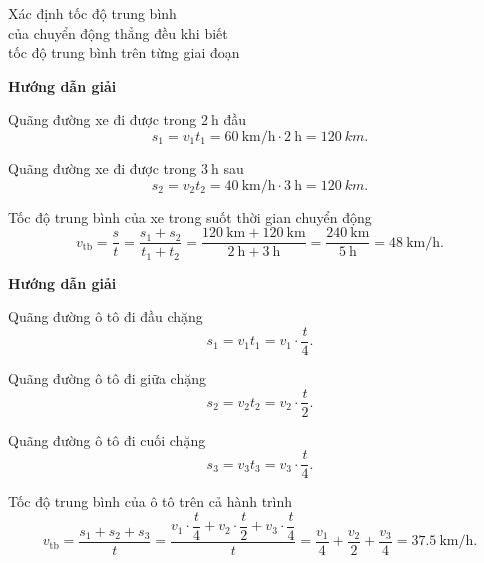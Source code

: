 \begin{dang}{Xác định tốc độ trung bình\\ của chuyển động thẳng đều khi biết \\tốc độ trung bình trên từng giai đoạn}
	{	\begin{center}
			\textbf{Hướng dẫn giải}
		\end{center}
		
		Quãng đường xe đi được trong $\SI{2}{\hour}$ đầu 
		\begin{equation*}
			s_1 = v_1t_1 =\SI{60}{\kilo\meter/\hour}\cdot\SI{2}{\hour} = \SI{120}{km}.
		\end{equation*}
		
		Quãng đường xe đi được trong $\SI{3}{\hour}$ sau 
		\begin{equation*}
			s_2 = v_2t_2 =\SI{40}{\kilo\meter/\hour}\cdot\SI{3}{\hour}= \SI{120}{km}.
		\end{equation*}
		
		Tốc độ trung bình của xe trong suốt thời gian chuyển động 
		\begin{equation*}
			v_{\text{tb}}=\dfrac{s}{t}=\dfrac{s_1+s_2}{t_1+t_2}=\dfrac{\SI{120}{\kilo\meter}+\SI{120}{\kilo\meter}}{\SI{2}{\hour}+\SI{3}{\hour}}=\dfrac{\SI{240}{\kilo\meter}}{\SI{5}{\hour}}=\SI{48}{\km/\hour}.
		\end{equation*}
		
	}
	{	\begin{center}
			\textbf{Hướng dẫn giải}
		\end{center}
		
		Quãng đường ô tô đi đầu chặng 
		\begin{equation*}
			s_1=v_1t_1=v_1\cdot\dfrac{t}{4}.
		\end{equation*}
		
		Quãng đường ô tô đi giữa chặng 
		\begin{equation*}
			s_2=v_2t_2=v_2\cdot\dfrac{t}{2}.
		\end{equation*}
		
		Quãng đường ô tô đi cuối chặng 
		\begin{equation*}
			s_3=v_3t_3=v_3\cdot\dfrac{t}{4}.
		\end{equation*}
		
		Tốc độ trung bình của ô tô trên cả hành trình 
		\begin{equation*}
			v_{\text{tb}}=\dfrac{s_1+s_2+s_3}{t}=\dfrac{v_1\cdot\dfrac{t}{4}+v_2\cdot\dfrac{t}{2}+v_3\cdot\dfrac{t}{4}}{t}=\dfrac{v_1}{4}+\dfrac{v_2}{2}+\dfrac{v_3}{4}=\SI{37,5}{\km/\hour}.
		\end{equation*}
	}
\end{dang}
